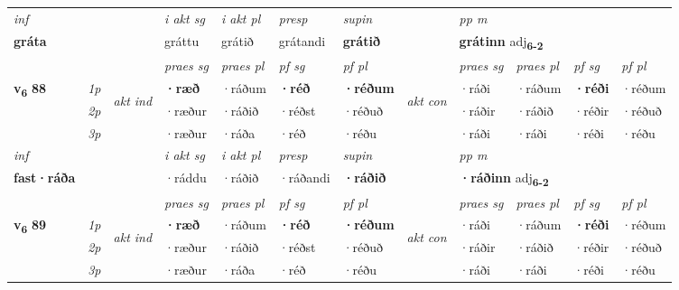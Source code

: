 \begin{longtable}[l]{X>{\footnotesize\itshape}llXXXXlXXXX}
   {\textit{inf}} & &  & \textit{i akt sg} & \textit{i akt pl}   & \textit{presp} & \textit{supin}  && \textit{pp m} \\*
  {\textbf{gráta}} & && gráttu  & grátið   & grátandi &  \textbf{grátið}  && \multicolumn{2}{l}{\textbf{grátinn} adj\textbf{\textsubscript{6-2}}} \\*

\midrule

 & &   & \textit{praes sg}  & \textit{praes pl}    & \textit{ pf sg} & \textit{pf pl} & & \textit{praes sg}  & \textit{praes pl}    & \textit{pf sg} & \textit{pf pl }  \\ \cmidrule{4-7} \cmidrule{9-12}
 \multirow{2}{*}{{{\textbf{v{\textsubscript{6}}} \Large{\textbf{88}}}}}  & 1p & \multirow{3}{*}{\begin{turn}{90}\textit{akt ind}\end{turn}} & \textbf{·ræð} & ·ráðum & \textbf{·réð} & \textbf{·réðum} & \multirow{3}{*}{\begin{turn}{90}\textit{akt con}\end{turn}} &·ráði & ·ráðum & \textbf{·réði} & ·réðum\\*
 & 2p &  &  ·ræður  & ·ráðið & ·réðst & ·réðuð & & ·ráðir & ·ráðið & ·réðir & ·réðuð \\*
 & 3p &  & ·ræður & ·ráða & ·réð & ·réðu & & ·ráði & ·ráði& ·réði & ·réðu \\*
\cmidrule{4-7} \cmidrule{9-12}

   {\textit{inf}} & &  & \textit{i akt sg} & \textit{i akt pl}   & \textit{presp} & \textit{supin}  && \textit{pp m} \\*
  {\textbf{fast\allowbreak ·ráða}} & && ·ráddu  & ·ráðið   & ·ráðandi &  \textbf{·ráðið}  && \multicolumn{2}{l}{\textbf{·ráðinn} adj\textbf{\textsubscript{6-2}}} \\*

\midrule

 & &   & \textit{praes sg}  & \textit{praes pl}    & \textit{ pf sg} & \textit{pf pl} & & \textit{praes sg}  & \textit{praes pl}    & \textit{pf sg} & \textit{pf pl }  \\ \cmidrule{4-7} \cmidrule{9-12}
 \multirow{2}{*}{{{\textbf{v{\textsubscript{6}}} \Large{\textbf{89}}}}}  & 1p & \multirow{3}{*}{\begin{turn}{90}\textit{akt ind}\end{turn}} & \textbf{·ræð} & ·ráðum & \textbf{·réð} & \textbf{·réðum} & \multirow{3}{*}{\begin{turn}{90}\textit{akt con}\end{turn}} &·ráði & ·ráðum & \textbf{·réði} & ·réðum\\*
 & 2p &  &  ·ræður  & ·ráðið & ·réðst & ·réðuð & & ·ráðir & ·ráðið & ·réðir & ·réðuð \\*
 & 3p &  & ·ræður & ·ráða & ·réð & ·réðu & & ·ráði & ·ráði& ·réði & ·réðu \\*
\cmidrule{4-7} \cmidrule{9-12}


\end{longtable}
